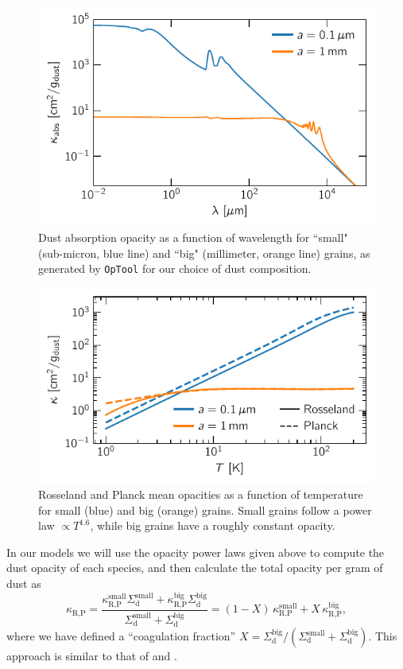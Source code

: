 \documentclass[fleqn,usenatbib,useAMS]{mnras}
\newcommand{\Sigmad}{\Sigma_\mathrm{d}}
\begin{document}
\begin{figure}
	\centering
	\includegraphics[width=\columnwidth]{kappa-wavelength.pdf}
	\caption{Dust absorption opacity as a function of wavelength for ``small" (sub-micron, blue line) and ``big" (millimeter, orange line) grains, as generated by \texttt{OpTool} for our choice of dust composition.}
	\label{fig:opacity-wavelength}
\end{figure}
%
\begin{figure}
	\centering
	\includegraphics[width=\columnwidth]{kappa-temperature.pdf}
	\caption{Rosseland and Planck mean opacities as a function of temperature for small (blue) and big (orange) grains. Small grains follow a power law $\propto T^{1.6}$, while big grains have a roughly constant opacity.}
	\label{fig:opacity-temperature}
\end{figure}
%
In our models we will use the opacity power laws given above to compute the dust opacity of each species, and then calculate the total opacity per gram of dust as
%
\begin{equation}
	\label{eq:avg-kappa}
	\kappa_\text{R,P} = \frac{\kappa_\text{R,P}^\text{small}\Sigmad^\text{small} + \kappa_\text{R,P}^\text{big}\Sigmad^\text{big}}{\Sigmad^\text{small} + \Sigmad^\text{big}} = (1-X)\,\kappa_\text{R,P}^\text{small} + X\,\kappa_\text{R,P}^\text{big},
\end{equation}
%
where we have defined a ``coagulation fraction'' $X=\Sigmad^\text{big}/(\Sigmad^\text{small}+\Sigmad^\text{big})$. This approach is similar to that of \citet{binkert-etal-2023} and \citet{krapp-etal-2024}.
\end{document}
